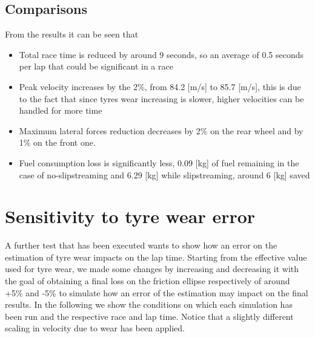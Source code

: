 \documentclass{report}
\let\Oldsection\section
\renewcommand{\section}{\FloatBarrier\Oldsection}
\let\Oldsubsection\subsection
\renewcommand{\subsection}{\FloatBarrier\Oldsubsection}
\begin{document}
\subsection{Comparisons}
From the results it can be seen that
\begin{itemize}
    \item Total race time is reduced by around 9 seconds, so an average of 0.5 seconds per lap that could be significant in a race
    \item Peak velocity increases by the 2\%, from 84.2 [m/s] to 85.7 [m/s], this is due to the fact that since tyres wear increasing is slower, higher velocities can be handled for more time
    \item Maximum lateral forces reduction decreases by 2\% on the rear wheel and by 1\% on the front one. 
    \item Fuel consumption loss is significantly less, 0.09 [kg] of fuel remaining in the case of no-slipstreaming and 6.29 [kg] while slipstreaming, around 6 [kg] saved
\end{itemize} 


\section{Sensitivity to tyre wear error}
A further test that has been executed wants to show how an error on the estimation of tyre wear impacts on the lap time. Starting from the effective value used for tyre wear, we made some changes by increasing and decreasing it with the goal of obtaining a final loss on the friction ellipse respectively of around +5\% and -5\% to simulate how an error of the estimation may impact on the final results.
In the following we show the conditions on which each simulation has been run and the respective race and lap time. Notice that a slightly different scaling in velocity due to wear has been applied.
\end{document}
